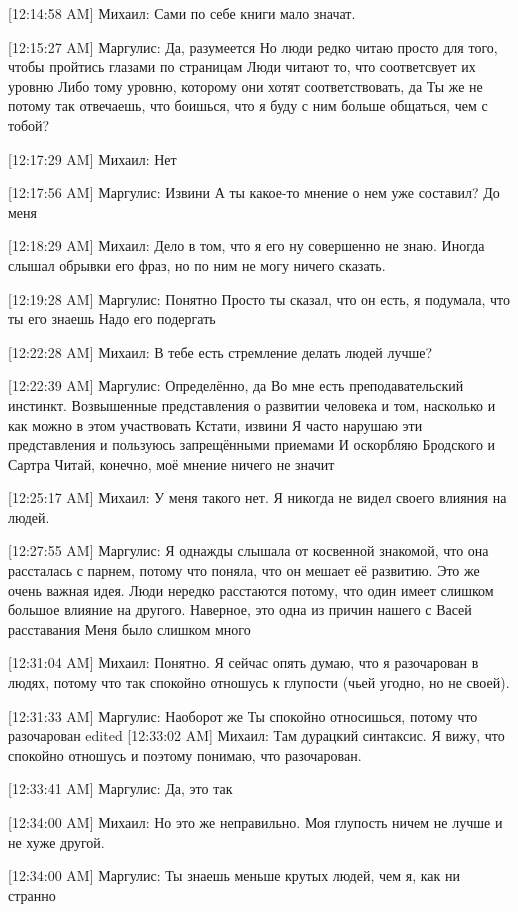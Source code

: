 \documentclass{article}
\begin{document}
{[12:14:58 AM] Михаил:
Сами по себе книги мало значат.

[12:15:27 AM] Маргулис:
Да, разумеется
 Но люди редко читаю просто для того, чтобы пройтись глазами по страницам
 Люди читают то, что соответсвует их уровню
 Либо тому уровню, которому они хотят соответствовать, да
 Ты же не потому так отвечаешь, что боишься, что я буду с ним больше общаться, чем с тобой?

[12:17:29 AM] Михаил:
Нет

[12:17:56 AM] Маргулис:
Извини
 А ты какое-то мнение о нем уже составил?
 До меня

[12:18:29 AM] Михаил:
Дело в том, что я его ну совершенно не знаю.
 Иногда слышал обрывки его фраз, но по ним не могу ничего сказать.

[12:19:28 AM] Маргулис:
Понятно
 Просто ты сказал, что он есть, я подумала, что ты его знаешь
 Надо его подергать

[12:22:28 AM] Михаил:
В тебе есть стремление делать людей лучше?

[12:22:39 AM] Маргулис:
Определённо, да
 Во мне есть преподавательский инстинкт. Возвышенные представления о развитии человека и том, насколько и как можно в этом участвовать
 Кстати, извини
 Я часто нарушаю эти представления и пользуюсь запрещёнными приемами
 И оскорбляю Бродского и Сартра
 Читай, конечно, моё мнение ничего не значит

[12:25:17 AM] Михаил:
У меня такого нет. Я никогда не видел своего влияния на людей.

[12:27:55 AM] Маргулис:
Я однажды слышала от косвенной знакомой, что она рассталась с парнем, потому что поняла, что он мешает её развитию. Это же очень важная идея. Люди нередко расстаются потому, что один имеет слишком большое влияние на другого. Наверное, это одна из причин нашего с Васей расставания
 Меня было слишком много

[12:31:04 AM] Михаил:
Понятно. Я сейчас опять думаю, что я разочарован в людях, потому что так спокойно отношусь к глупости (чьей угодно, но не своей).

[12:31:33 AM] Маргулис:
Наоборот же
 Ты спокойно относишься, потому что разочарован
edited 
[12:33:02 AM] Михаил:
Там дурацкий синтаксис. Я вижу, что спокойно отношусь и поэтому понимаю, что разочарован.

[12:33:41 AM] Маргулис:
Да, это так

[12:34:00 AM] Михаил:
Но это же неправильно. Моя глупость ничем не лучше и не хуже другой.

[12:34:00 AM] Маргулис:
Ты знаешь меньше крутых людей, чем я, как ни странно

}
\end{document}
